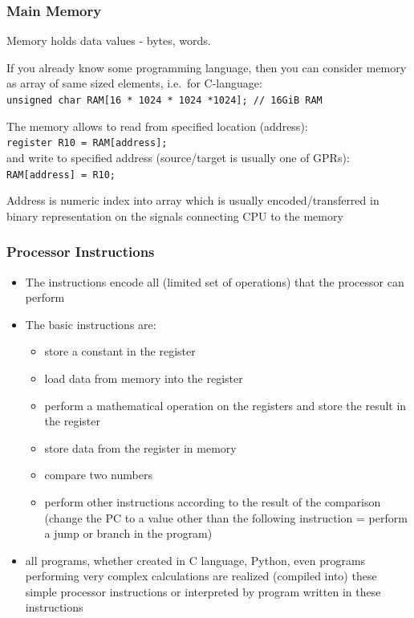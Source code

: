 \documentclass{beamer}
\begin{document}
\begin{frame}
\frametitle{Main Memory}

Memory holds data values - bytes, words.

If you already know some programming language, then you can consider memory as array of same sized elements, i.e.\ for C-language:\\
\texttt{unsigned char RAM[16 * 1024 * 1024 *1024]; // 16GiB RAM}

\bigskip
The memory allows to read from specified location (address):\\
\texttt{register R10 = RAM[address];}\\
and write to specified address (source/target is usually one of GPRs):\\
\texttt{RAM[address] = R10;}
\bigskip

Address is numeric index into array which is usually encoded/transferred in binary representation on the signals connecting CPU to the memory

\end{frame}

\begin{frame}
\frametitle{Processor Instructions}

\begin{itemize}
\item The instructions encode all (limited set of operations) that the processor can perform
\item The basic instructions are:
\begin{itemize}
\item store a constant in the register
\item load data from memory into the register
\item perform a mathematical operation on the registers and store the result in the register
\item store data from the register in memory
\item compare two numbers
\item perform other instructions according to the result of the comparison (change the PC to a value other than the following instruction = perform a jump or branch in the program)
\end{itemize}
\item all programs, whether created in C language, Python, even programs performing very complex calculations are realized (compiled into) these simple processor instructions or interpreted by program written in these instructions
\end{itemize}

\end{frame}
\end{document}
